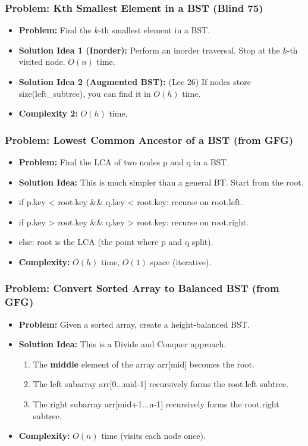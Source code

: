 \subsubsection{Problem: Kth Smallest Element in a BST (Blind 75)}
\begin{itemize}
\item \textbf{Problem:} Find the $k$-th smallest element in a BST.
\item \textbf{Solution Idea 1 (Inorder):} Perform an inorder traversal. Stop at the $k$-th visited node. $O(n)$ time.
\item \textbf{Solution Idea 2 (Augmented BST):} (Lec 26) If nodes store size(left\_subtree), you can find it in $O(h)$ time.
\item \textbf{Complexity 2:} $O(h)$ time.
\end{itemize}

\subsubsection{Problem: Lowest Common Ancestor of a BST (from GFG)}
\begin{itemize}
\item \textbf{Problem:} Find the LCA of two nodes p and q in a BST.
\item \textbf{Solution Idea:} This is much simpler than a general BT. Start from the root.
\item if p.key < root.key \&\& q.key < root.key: recurse on root.left.
\item if p.key > root.key \&\& q.key > root.key: recurse on root.right.
\item else: root is the LCA (the point where p and q split).
\item \textbf{Complexity:} $O(h)$ time, $O(1)$ space (iterative).
\end{itemize}

\subsubsection{Problem: Convert Sorted Array to Balanced BST (from GFG)}
\begin{itemize}
\item \textbf{Problem:} Given a sorted array, create a height-balanced BST.
\item \textbf{Solution Idea:} This is a Divide and Conquer approach.
\begin{enumerate}
\item The \textbf{middle} element of the array arr[mid] becomes the root.
\item The left subarray arr[0...mid-1] recursively forms the root.left subtree.
\item The right subarray arr[mid+1...n-1] recursively forms the root.right subtree.
\end{enumerate}
\item \textbf{Complexity:} $O(n)$ time (visits each node once).
\end{itemize}


